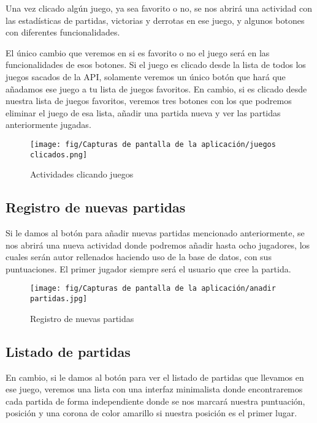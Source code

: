 Una vez clicado algún juego, ya sea favorito o no, se nos abrirá una actividad con las estadísticas de partidas, victorias y derrotas en ese juego, y algunos botones con diferentes funcionalidades.

El único cambio que veremos en si es favorito o no el juego será en las funcionalidades de esos botones. Si el juego es clicado desde la lista de todos los juegos sacados de la API, solamente veremos un único botón que hará que añadamos ese juego a tu lista de juegos favoritos. En cambio, si es clicado desde nuestra lista de juegos favoritos, veremos tres botones con los que podremos eliminar el juego de esa lista, añadir una partida nueva y ver las partidas anteriormente jugadas.

\begin{figure}[H]
    \centering
    \texttt{[image: fig/Capturas de pantalla de la aplicación/juegos clicados.png]}
    \caption{Actividades clicando juegos}
    \label{fig:actividades clicando juegos}
\end{figure}

\subsection{Registro de nuevas partidas}

Si le damos al botón para añadir nuevas partidas mencionado anteriormente, se nos abrirá una nueva actividad donde podremos añadir hasta ocho jugadores, los cuales serán autor rellenados haciendo uso de la base de datos, con sus puntuaciones. El primer jugador siempre será el usuario que cree la partida.

\begin{figure}[H]
    \centering
    \texttt{[image: fig/Capturas de pantalla de la aplicación/anadir partidas.jpg]}
    \caption{Registro de nuevas partidas}
    \label{fig:registro de nuevas partidas}
\end{figure}

\subsection{Listado de partidas}

En cambio, si le damos al botón para ver el listado de partidas que llevamos en ese juego, veremos una lista con una interfaz minimalista donde encontraremos cada partida de forma independiente donde se nos marcará nuestra puntuación, posición y una corona de color amarillo si nuestra posición es el primer lugar.

